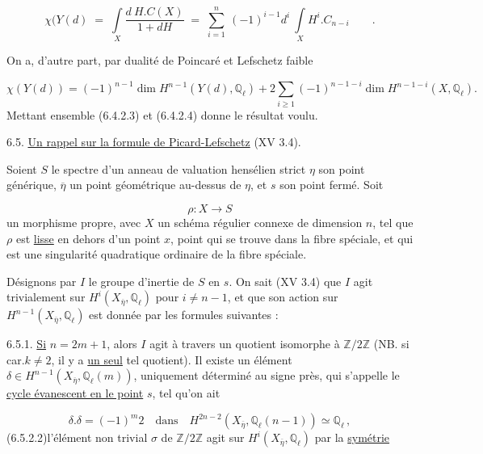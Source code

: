\begin{equation}\tag{6.4.2.3}
\chi(Y(d) \;=\; \int\limits_X \frac{d\ H.C(X)}{1 + dH} \;=\; \sum_{i=1}^{n} \ (-1)^{i-1} d^i \ \int\limits_X H^i . C_{n-i} \qquad .
\end{equation}


On a, d'autre part, par dualité de Poincaré et Lefschetz faible

\begin{equation}\tag{6.4.2.4}
\chi(Y(d)) = (-1)^{n-1}\dim H^{n-1}(Y(d),\mathbb{Q}_\ell) + 2 \sum_{i \geq 1} (-1)^{n-1-i}\dim H^{n-1-i}(X,\mathbb{Q}_\ell).
\end{equation}
Mettant ensemble (6.4.2.3) et (6.4.2.4) donne le résultat voulu.


6.5. \underline{Un rappel sur la formule de Picard-Lefschetz} (XV 3.4).

Soient $S$ le spectre d'un anneau de valuation hensélien strict $\eta$ son point générique, $\overline{\eta}$ un point géométrique au-dessus de $\eta$, et $s$ son point fermé. Soit

\begin{equation*}
\rho : X \longrightarrow S
\end{equation*}
un morphisme propre, avec $X$ un schéma régulier connexe de dimension $n$, tel que $\rho$ est \underline{lisse} en dehors d'un point $x$, point qui se trouve dans la fibre spéciale, et qui est une singularité quadratique ordinaire de la fibre spéciale.

Désignons par $I$ le groupe d'inertie de $S$ en $s$. On sait (XV 3.4) que $I$ agit trivialement sur $H^i(X_{\overline{\eta}},\mathbb{Q}_\ell)$ pour $i \neq n-1$, et que son action sur $H^{n-1}(X_{\overline{\eta}},\mathbb{Q}_\ell)$ est donnée par les formules suivantes :

6.5.1. \underline{Si} $n = 2m+1$, alors $I$ agit à travers un quotient isomorphe à $\mathbb{Z}/2\mathbb{Z}$ (NB. si car.$k \neq 2$, il y a \underline{un seul} tel quotient). Il existe un élément $\delta \in H^{n-1}(X_{\overline{\eta}},\mathbb{Q}_\ell(m))$, uniquement déterminé au signe près, qui s'appelle le \underline{cycle évanescent en le point} $s$, tel qu'on ait 



\begin{equation}\tag{6.5.1.1}
 \delta.\delta = (-1)^m 2 \quad \text{dans} \quad H^{2n-2}(X_{\overline{\eta}},\mathbb{Q}_\ell(n-1)) \simeq \mathbb{Q}_\ell \, ,
\end{equation}
(6.5.2.2)\quad l'élément non trivial $\sigma$ de $\mathbb{Z}/2\mathbb{Z}$ agit sur $H^i(X_{\overline{\eta}},\mathbb{Q}_\ell)$ par la \underline{symétrie}

